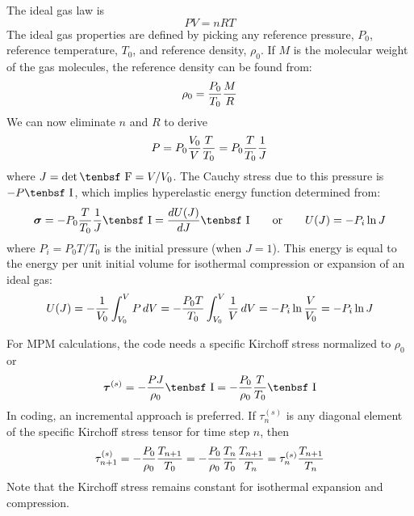 \documentclass[11pt]{article}
\renewcommand{\vec}[1]{\boldsymbol{#1}}
\def\F{\hbox{\tenbsf F}}
\def\I{\hbox{\tenbsf I}}
\begin{document}
The ideal gas law is
\begin{equation}
    PV = nRT
\end{equation}
The ideal gas properties are defined by picking any reference pressure, $P_0$, reference temperature, $T_0$, and reference density, $\rho_0$. If $M$ is the molecular weight of the gas molecules, the reference density can be found from:
\begin{equation}
    \rho_0 = {P_0\over T_0} {M\over R}
\end{equation}
We can now eliminate $n$ and $R$ to derive
\begin{equation}
    P = P_0{V_0\over V}{T\over T_0} = P_0 {T\over T_0} {1\over J} \label{geniglaw}
\end{equation}
where $J = \det \F = V/V_0$. The Cauchy stress due to this pressure is $-P\I$, which implies hyperelastic energy function determined from:
\begin{equation}
    \vec\sigma = - P_0 {T\over T_0} {1\over J}\I = {dU(J)\over dJ}\I
        \qquad{\rm or}\qquad
         U(J) = - P_i \ln J
\end{equation}
where $P_i = P_0T/T_0$ is the initial pressure (when $J=1$). This energy is equal to the energy per unit initial volume for isothermal compression or expansion of an ideal gas:
\begin{equation}
    U(J) = - {1\over V_0} \int_{V_0}^V P\thinspace dV = - {P_0T\over T_0} \int_{V_0}^V {1\over V}\thinspace dV = - P_i \ln {V\over V_0} = - P_i \ln J
\end{equation}

For MPM calculations, the code needs a specific Kirchoff stress normalized to $\rho_0$ or
\begin{equation}
    \vec\tau^{(s)} = -{PJ\over \rho_0}\I  = - {P_0\over \rho_0} {T\over T_0}\I
\end{equation}
In coding, an incremental approach is preferred. 
If $\tau_n^{(s)}$ is any diagonal element of the specific Kirchoff stress tensor for time step $n$, then
\begin{equation}
   \tau_{n+1}^{(s)} = - {P_0\over \rho_0} {T_{n+1}\over T_0}  = - {P_0\over \rho_0} {T_n\over T_0} {T_{n+1}\over T_n}
       = \tau_n^{(s)} {T_{n+1}\over T_n}
\end{equation}
Note that the Kirchoff stress remains constant for isothermal expansion and compression.
\end{document}
